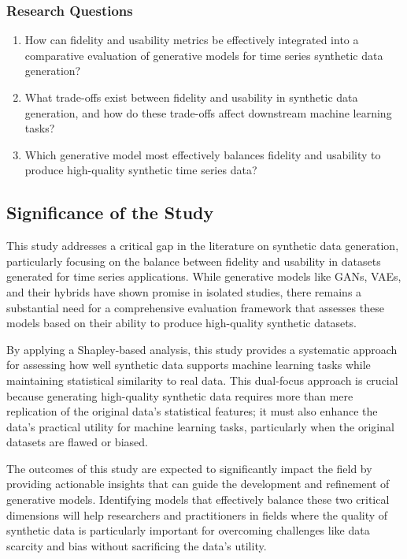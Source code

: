 \documentclass{article}
\begin{document}
\subsubsection{Research Questions}
\begin{enumerate}
    \item How can fidelity and usability metrics be effectively integrated into a comparative evaluation of generative models for time series synthetic data generation?
    \item What trade-offs exist between fidelity and usability in synthetic data generation, and how do these trade-offs affect downstream machine learning tasks?
    \item Which generative model most effectively balances fidelity and usability to produce high-quality synthetic time series data?
\end{enumerate}

\subsection{Significance of the Study}
This study addresses a critical gap in the literature on synthetic data generation, particularly focusing on the balance between fidelity and usability in datasets generated for time series applications. While generative models like GANs, VAEs, and their hybrids have shown promise in isolated studies, there remains a substantial need for a comprehensive evaluation framework that assesses these models based on their ability to produce high-quality synthetic datasets.

By applying a Shapley-based analysis, this study provides a systematic approach for assessing how well synthetic data supports machine learning tasks while maintaining statistical similarity to real data. This dual-focus approach is crucial because generating high-quality synthetic data requires more than mere replication of the original data’s statistical features; it must also enhance the data's practical utility for machine learning tasks, particularly when the original datasets are flawed or biased.

The outcomes of this study are expected to significantly impact the field by providing actionable insights that can guide the development and refinement of generative models. Identifying models that effectively balance these two critical dimensions will help researchers and practitioners in fields where the quality of synthetic data is particularly important for overcoming challenges like data scarcity and bias without sacrificing the data’s utility.
\end{document}
